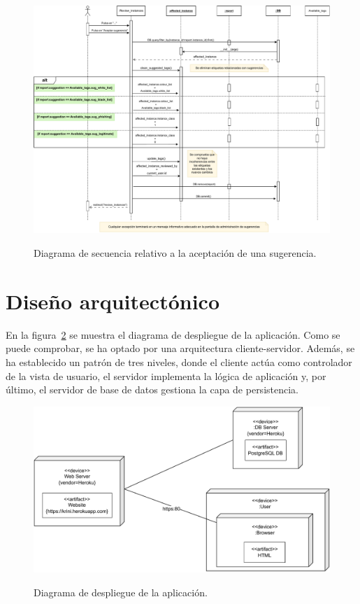 	\begin{landscape}
		\begin{figure}[h]
			\caption[Diagrama: secuencia (aceptar sugerencia)]{Diagrama de secuencia relativo a la aceptación de una sugerencia.}
			\centering
			\includegraphics[scale=0.55]{../img/anexos/diagrams/sequence-accept_review}
			\label{c:diagrama-seq-accept-review}
		\end{figure}
	\end{landscape}

\section{Diseño arquitectónico}
\label{s:diseño-arquitectonico}

En la figura~\ref{c:diagrama-deploy} se muestra el diagrama de despliegue de la aplicación. Como se puede comprobar, se ha optado por una arquitectura cliente-servidor. Además, se ha establecido un patrón de tres niveles, donde el cliente actúa como controlador de la vista de usuario, el servidor implementa la lógica de aplicación y, por último, el servidor de base de datos gestiona la capa de persistencia.

	\begin{figure}[h]
	\caption[Diagrama: despliegue]{Diagrama de despliegue de la aplicación.}
	\centering
	\includegraphics[width=\textwidth]{../img/anexos/diagrams/deploy}
	\label{c:diagrama-deploy}
	\end{figure}